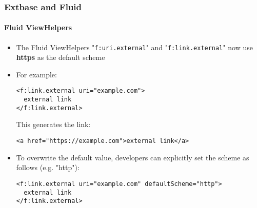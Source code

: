 %

\begin{frame}[fragile]
	\frametitle{Extbase and Fluid}
	\framesubtitle{Fluid ViewHelpers}


	\begin{itemize}
		\item The Fluid ViewHelpers "\texttt{f:uri.external}" and "\texttt{f:link.external}"
			now use \textbf{https} as the default scheme
		\item For example:
\begin{lstlisting}
<f:link.external uri="example.com">
  external link
</f:link.external>
\end{lstlisting}
			This generates the link:
\begin{lstlisting}
<a href="https://example.com">external link</a>
\end{lstlisting}

		\item To overwrite the default value, developers can explicitly set the
			scheme as follows (e.g. "http"):
\begin{lstlisting}
<f:link.external uri="example.com" defaultScheme="http">
  external link
</f:link.external>
\end{lstlisting}

	\end{itemize}

\end{frame}

